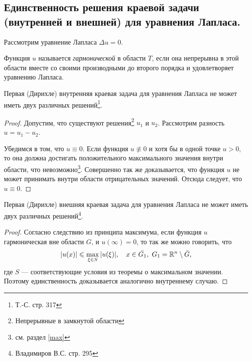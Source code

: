 \subsection{Единственность решения краевой задачи (внутренней и внешней) для уравнения Лапласа.}

Рассмотрим уравнение Лапласа $\Delta u = 0$.

Функция $u$ называется \emph{гармонической} в области $T$, если она непрерывна в
этой области вместе со своими производными до второго порядка и удовлетворяет уравнению Лапласа. 

\begin{theorem}
	Первая (Дирихле) внутренняя краевая задача для уравнения Лапласа не может иметь двух различных решений\footnote{Т.-С. стр. 317}.
\end{theorem}


\begin{proof}
	Допустим, что существуют решения\footnote{Непрерывные в замкнутой области} $u_1$ и $u_2$. Рассмотрим разность $u = u_1 - u_2$.
	
	Убедимся в том, что $u \equiv 0$. Если функция $u \not \equiv 0$ и хотя бы в одной точке $u > 0$, то она должна достигать положительного максимального значения внутри области, что невозможно\footnote{см. раздел \ref{max}}. Совершенно так же доказывается, что функция $u$ не может принимать внутри области отрицательных значений. Отсюда следует, что $u \equiv 0$.
\end{proof}


\begin{theorem}Первая (Дирихле) внешняя краевая задача для уравнения Лапласа не
  может иметь двух различных решений\footnote{Владимиров В.С. стр. 295}.
\end{theorem}
\begin{proof}
Согласно следствию из принципа максимума, если функция $u$ гармоническая вне области $G$, и $u(\infty) = 0$, то так же можно говорить, что 
\begin{equation*}
	\abs{u(x)} \leqslant \max\limits_{\xi \in S}{\abs{u(\xi)}}, \quad x \in
  \bar{G_1},\  G_1 = \mathbb{R}^n \setminus \bar{G},
\end{equation*}
где $ S $ --- соответствующие условия из теоремы о максимальном значении. Поэтому единственность доказывается аналогично внутреннему случаю. 
\end{proof}

